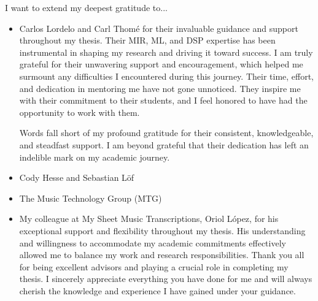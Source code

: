 

\begin{acknowledgement}

I want to extend my deepest gratitude to...

\begin{itemize}
\item Carlos Lordelo and Carl Thomé for their invaluable guidance and support throughout my thesis. Their MIR, ML, and DSP expertise has been instrumental in shaping my research and driving it toward success. I am truly grateful for their unwavering support and encouragement, which helped me surmount any difficulties I encountered during this journey. Their time, effort, and dedication in mentoring me have not gone unnoticed. They inspire me with their commitment to their students, and I feel honored to have had the opportunity to work with them.

Words fall short of my profound gratitude for their consistent, knowledgeable, and steadfast support. I am beyond grateful that their dedication has left an indelible mark on my academic journey.

\vspace*{3mm}
\item Cody Hesse and Sebastian Löf
\vspace*{3mm}
\item The Music Technology Group (MTG)
\vspace*{3mm}
\item My colleague at My Sheet Music Transcriptions, Oriol López, for his exceptional support and flexibility throughout my thesis. His understanding and willingness to accommodate my academic commitments effectively allowed me to balance my work and research responsibilities.
\vspace*{3mm}
Thank you all for being excellent advisors and playing a crucial role in completing my thesis. I sincerely appreciate everything you have done for me and will always cherish the knowledge and experience I have gained under your guidance.
\vspace*{3mm}
\end{itemize}

\newpage
\end{acknowledgement}